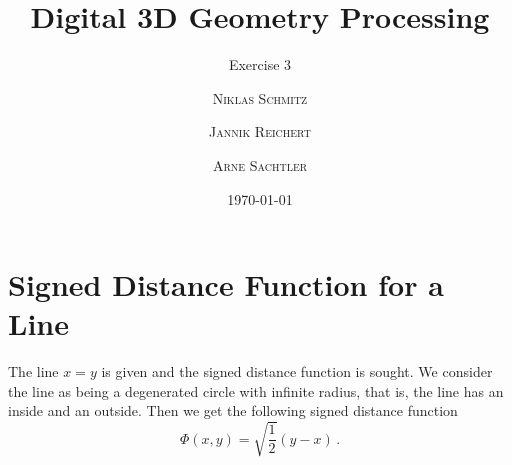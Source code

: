 \documentclass{scrartcl}
\title{Digital 3D Geometry Processing}
\subtitle{Exercise 3}
\author{\textsc{Niklas Schmitz} \and \textsc{Jannik Reichert} \and \textsc{Arne Sachtler}}
\date{\today}
\begin{document}
\maketitle

\section{Signed Distance Function for a Line}
The line $x = y$ is given and the signed distance function is sought.
We consider the line as being a degenerated circle with infinite radius, that is, the line has an inside and an outside.
Then we get the following signed distance function
\begin{equation}
	\Phi (x,y) = \sqrt{\frac{1}{2}} (y - x) \, .
\end{equation}


	
\end{document}
